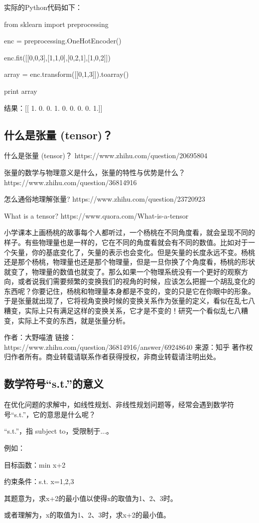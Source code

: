 \documentclass[UTF8]{ctexart}
\begin{document}
实际的Python代码如下：

from sklearn import preprocessing

enc = preprocessing.OneHotEncoder()

enc.fit([[0,0,3],[1,1,0],[0,2,1],[1,0,2]])

array = enc.transform([[0,1,3]]).toarray()

print array

结果：[[ 1.  0.  0.  1.  0.  0.  0.  0.  1.]]

\subsection{什么是张量 (tensor)？}
什么是张量 (tensor)？ https://www.zhihu.com/question/20695804

张量的数学与物理意义是什么，张量的特性与优势是什么？ https://www.zhihu.com/question/36814916

怎么通俗地理解张量? https://www.zhihu.com/question/23720923

What is a tensor? https://www.quora.com/What-is-a-tensor


小学课本上画杨桃的故事每个人都听过，一个杨桃在不同角度看，就会呈现不同的样子。有些物理量也是一样的，它在不同的角度看就会有不同的数值。比如对于一个矢量，你的基底变化了，矢量的表示也会变化。但是矢量的长度永远不变。杨桃还是那个杨桃，物理量也还是那个物理量，但是一旦你换了个角度看，杨桃的形状就变了，物理量的数值也就变了。那么如果一个物理系统没有一个更好的观察方向，或者说我们需要频繁的变换我们的视角的时候，应该怎么把握一个胡乱变化的东西呢？你要记住，杨桃和物理量本身都是不变的，变的只是它在你眼中的形象。于是张量就出现了，它将视角变换时候的变换关系作为张量的定义，看似在乱七八糟变，实际上只有满足这样的变换关系，它才是不变的！研究一个看似乱七八糟变，实际上不变的东西，就是张量分析。

作者：大野喵渣
链接：https://www.zhihu.com/question/36814916/answer/69248640
来源：知乎
著作权归作者所有。商业转载请联系作者获得授权，非商业转载请注明出处。

\subsection{数学符号“s.t.”的意义}

在优化问题的求解中，如线性规划、非线性规划问题等，经常会遇到数学符号“s.t.”，它的意思是什么呢？

“s.t.”，指 subject to，受限制于...。

例如：

                目标函数：min {x+2}

                约束条件：s.t.  x={1,2,3}

其题意为，求x+2的最小值以使得x的取值为1、2、3时。

或者理解为，x的取值为1、2、3时，求x+2的最小值。
\end{document}
